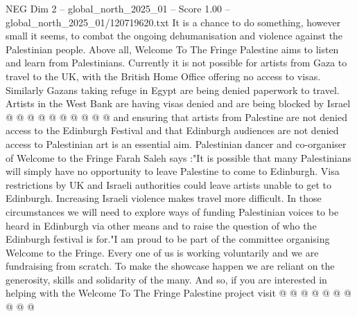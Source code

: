\begin{textsample}{NEG Dim 2 – global\_north\_2025\_01 – Score 1.00 – global\_north\_2025\_01/120719620.txt}
It is a chance to do something, however small it seems, to combat the ongoing dehumanisation and violence against the Palestinian people.
Above all, Welcome To The Fringe Palestine aims to listen and learn from Palestinians.
Currently it is not possible for artists from Gaza to travel to the UK, with the British Home Office offering no access to visas.
Similarly Gazans taking refuge in Egypt are being denied paperwork to travel.
Artists in the West Bank are having visas denied and are being blocked by Israel @ @ @ @ @ @ @ @ @ @ and ensuring that artists from Palestine are not denied access to the Edinburgh Festival and that Edinburgh audiences are not denied access to Palestinian art is an essential aim.
Palestinian dancer and co-organiser of Welcome to the Fringe Farah Saleh says :"It is possible that many Palestinians will simply have no opportunity to leave Palestine to come to Edinburgh.
Visa restrictions by UK and Israeli authorities could leave artists unable to get to Edinburgh.
Increasing Israeli violence makes travel more difficult.
In those circumstances we will need to explore ways of funding Palestinian voices to be heard in Edinburgh via other means and to raise the question of who the Edinburgh festival is for."I am proud to be part of the committee organising Welcome to the Fringe.
Every one of us is working voluntarily and we are fundraising from scratch.
To make the showcase happen we are reliant on the generosity, skills and solidarity of the many.
And so, if you are interested in helping with the Welcome To The Fringe Palestine project visit @ @ @ @ @ @ @ @ @ @

\end{textsample}
